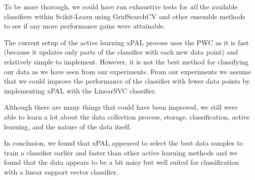To be more thorough, we could have run exhaustive tests for \textit{all} the available classifiers within Scikit-Learn using GridSearchCV and other ensemble methods to see if any more performance gains were attainable. 

The current setup of the active learning xPAL process uses the PWC as it is fast (because it updates only parts of the classifier with each new data point) and relatively simple to implement. However, it is not the best method for classifying our data as we have seen from our experiments. From our experiments we assume that we could improve the performance of the classifier with fewer data points by implementing xPAL with the LinearSVC classifier.

Although there are many things that could have been improved, we still were able to learn a lot about the data collection process, storage, classification, active learning, and the nature of the data itself. 

In conclusion, we found that xPAL appeared to select the best data samples to train a classifier earlier and faster than other active learning methods and we found that the data appears to be a bit noisy but well suited for classification with a linear support vector classifier.

